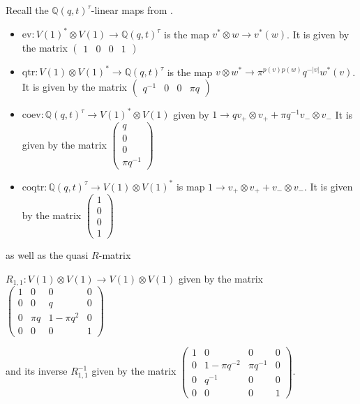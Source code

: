 \documentclass{amsart}
\def\Q{\mathsf{Q}}
\theoremstyle{plain}
\theoremstyle{definition}
\theoremstyle{definition}
\numberwithin{equation}{section}
\numberwithin{theorem}{section}
\renewcommand{\to}{\rightarrow}
\def\Q{\mathbb{Q}}
\numberwithin{equation}{section}
\begin{document}
Recall the $\Q(q,t)^{\tau}$-linear maps from \cite[Lemma 2.7]{C}.
\begin{itemize}
  \item $\text{ev}:V(1)^* \otimes V(1) \to \Q(q,t)^{\tau}$ is the map $v^*\otimes w \to v^*(w)$. It is given by the matrix
  $\begin{pmatrix}
    1 & 0 & 0 & 1
  \end{pmatrix}$
  \item $\text{qtr}:V(1) \otimes V(1)^* \to \Q(q,t)^{\tau}$ is the map $v\otimes w^* \to \pi^{p(v)p(w)}q^{-|v|}w^*(v)$. It is given by the matrix
  $\begin{pmatrix}
    q^{-1} & 0 & 0 & \pi q
  \end{pmatrix}$
  \item $\text{coev}:\Q(q,t)^{\tau} \to V(1)^* \otimes V(1) $ given by $1\to qv_{+}\otimes v_{+} + \pi q^{-1} v_{-}\otimes v_{-}$ It is given by the matrix
  $\begin{pmatrix}
     q \\
     0 \\
     0 \\
     \pi q^{-1}
   \end{pmatrix}$
  \item $\text{coqtr}:\Q(q,t)^{\tau} \to V(1) \otimes V(1)^* $ is map $1\to v_{+}\otimes v_{+}+ v_{-}\otimes v_{-}$. It is given by the matrix
  $\begin{pmatrix}
     1 \\
     0 \\
     0 \\
     1
   \end{pmatrix}$
\end{itemize}
as well as the quasi $R$-matrix

$R_{1,1}:V(1)\otimes V(1) \to V(1)\otimes V(1)$ given by the matrix
$\begin{pmatrix}
1 & 0 & 0 & 0 \\
0 & 0 &  q & 0 \\
0 & \pi q & 1-\pi q^2 & 0 \\
0 & 0 & 0 & 1
\end{pmatrix}$

and its inverse $R_{1,1}^{-1}$ given by the matrix
$\begin{pmatrix}
1 & 0 & 0 & 0 \\
0 & 1-\pi q^{-2} & \pi q^{-1} & 0 \\
0 & q^{-1} & 0 & 0 \\
0 & 0 & 0 & 1
\end{pmatrix}$.
\end{document}
